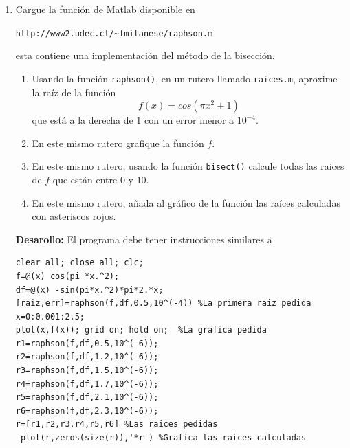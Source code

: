\documentclass[11pt]{article}
\begin{document}
\begin{enumerate}
\item Cargue la funci\'on de Matlab disponible en
\begin{center}
\texttt{http://www2.udec.cl/\~{}fmilanese/raphson.m}
\end{center}
esta contiene una implementaci\'on del m\'etodo de la bisecci\'on.

\begin{enumerate}
	\item Usando la funci\'on \texttt{raphson()}, en un rutero llamado \texttt{raices.m}, aproxime la ra\'iz de la funci\'on 
    $$
		f(x)=cos(\pi x^2+1)
	$$
    que est\'a a la derecha de $1$ con un error menor a $10^{-4}$.
    \item En este mismo rutero grafique la funci\'on $f$.
    \item En este mismo rutero, usando la funci\'on \texttt{bisect()} calcule todas las raices de $f$ que est\'an entre $0$ y $10$.
    \item En este mismo rutero, a\~{n}ada al gr\'afico de la funci\'on las ra\'ices calculadas con asteriscos rojos.
\end{enumerate}

\textbf{Desarollo:} El programa debe tener instrucciones similares a
\begin{lstlisting}
clear all; close all; clc;
f=@(x) cos(pi *x.^2);
df=@(x) -sin(pi*x.^2)*pi*2.*x;
[raiz,err]=raphson(f,df,0.5,10^(-4)) %La primera raiz pedida
x=0:0.001:2.5;
plot(x,f(x)); grid on; hold on;  %La grafica pedida
r1=raphson(f,df,0.5,10^(-6));
r2=raphson(f,df,1.2,10^(-6));
r3=raphson(f,df,1.5,10^(-6));
r4=raphson(f,df,1.7,10^(-6));
r5=raphson(f,df,2.1,10^(-6));
r6=raphson(f,df,2.3,10^(-6));
r=[r1,r2,r3,r4,r5,r6] %Las raices pedidas
 plot(r,zeros(size(r)),'*r') %Grafica las raices calculadas
\end{lstlisting}
\end{enumerate}
\end{document}
